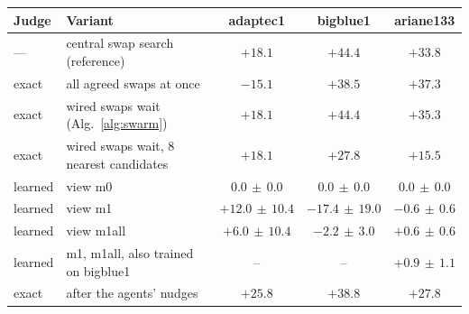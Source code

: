 \begin{tabular}{@{}llccc@{}}
\toprule
Judge & Variant & adaptec1 & bigblue1 & ariane133 \\
\midrule
--- & central swap search (reference) & $+18.1$ & $+44.4$ & $+33.8$ \\
\midrule
exact & all agreed swaps at once & $-15.1$ & $+38.5$ & $+37.3$ \\
exact & wired swaps wait (Alg.~\ref{alg:swarm}) & $+18.1$ & $+44.4$ & $+35.3$ \\
exact & wired swaps wait, 8 nearest candidates & $+18.1$ & $+27.8$ & $+15.5$ \\
\midrule
learned & view m0 & $0.0\,\pm\,0.0$ & $0.0\,\pm\,0.0$ & $0.0\,\pm\,0.0$ \\
learned & view m1 & $+12.0\,\pm\,10.4$ & $-17.4\,\pm\,19.0$ & $-0.6\,\pm\,0.6$ \\
learned & view m1all & $+6.0\,\pm\,10.4$ & $-2.2\,\pm\,3.0$ & $+0.6\,\pm\,0.6$ \\
learned & m1, m1all, also trained on bigblue1 & -- & -- & $+0.9\,\pm\,1.1$ \\
\midrule
exact & after the agents' nudges & $+25.8$ & $+38.8$ & $+27.8$ \\
\bottomrule
\end{tabular}